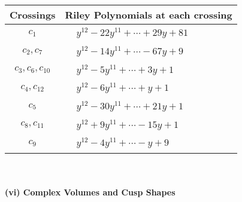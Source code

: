 \documentclass[1p]{elsarticle_modified}
\theoremstyle{definition}
\begin{document}
\begin{tabular}{m{50pt}|m{274pt}}
Crossings & \hspace{64pt}Riley Polynomials at each crossing \\
\hline $$\begin{aligned}c_{1}\end{aligned}$$&$\begin{aligned}
&y^{12}-22 y^{11}+\cdots+29 y+81
\end{aligned}$\\
\hline $$\begin{aligned}c_{2},c_{7}\end{aligned}$$&$\begin{aligned}
&y^{12}-14 y^{11}+\cdots-67 y+9
\end{aligned}$\\
\hline $$\begin{aligned}c_{3},c_{6},c_{10}\end{aligned}$$&$\begin{aligned}
&y^{12}-5 y^{11}+\cdots+3 y+1
\end{aligned}$\\
\hline $$\begin{aligned}c_{4},c_{12}\end{aligned}$$&$\begin{aligned}
&y^{12}-6 y^{11}+\cdots+y+1
\end{aligned}$\\
\hline $$\begin{aligned}c_{5}\end{aligned}$$&$\begin{aligned}
&y^{12}-30 y^{11}+\cdots+21 y+1
\end{aligned}$\\
\hline $$\begin{aligned}c_{8},c_{11}\end{aligned}$$&$\begin{aligned}
&y^{12}+9 y^{11}+\cdots-15 y+1
\end{aligned}$\\
\hline $$\begin{aligned}c_{9}\end{aligned}$$&$\begin{aligned}
&y^{12}-4 y^{11}+\cdots- y+9
\end{aligned}$\\
\hline
\end{tabular}\\~\\
\newpage\flushleft \textbf{(vi) Complex Volumes and Cusp Shapes}
\end{document}
